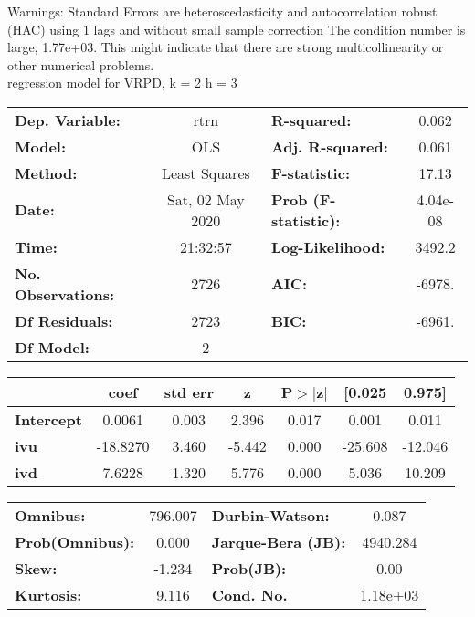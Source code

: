 Warnings: \newline
 [1] Standard Errors are heteroscedasticity and autocorrelation robust (HAC) using 1 lags and without small sample correction \newline
 [2] The condition number is large, 1.77e+03. This might indicate that there are \newline
 strong multicollinearity or other numerical problems.\\ 

regression model for VRPD, k = 2 h = 3\begin{center}
\begin{tabular}{lclc}
\toprule
\textbf{Dep. Variable:}    &       rtrn       & \textbf{  R-squared:         } &     0.062   \\
\textbf{Model:}            &       OLS        & \textbf{  Adj. R-squared:    } &     0.061   \\
\textbf{Method:}           &  Least Squares   & \textbf{  F-statistic:       } &     17.13   \\
\textbf{Date:}             & Sat, 02 May 2020 & \textbf{  Prob (F-statistic):} &  4.04e-08   \\
\textbf{Time:}             &     21:32:57     & \textbf{  Log-Likelihood:    } &    3492.2   \\
\textbf{No. Observations:} &        2726      & \textbf{  AIC:               } &    -6978.   \\
\textbf{Df Residuals:}     &        2723      & \textbf{  BIC:               } &    -6961.   \\
\textbf{Df Model:}         &           2      & \textbf{                     } &             \\
\bottomrule
\end{tabular}
\begin{tabular}{lcccccc}
                   & \textbf{coef} & \textbf{std err} & \textbf{z} & \textbf{P$> |$z$|$} & \textbf{[0.025} & \textbf{0.975]}  \\
\midrule
\textbf{Intercept} &       0.0061  &        0.003     &     2.396  &         0.017        &        0.001    &        0.011     \\
\textbf{ivu}       &     -18.8270  &        3.460     &    -5.442  &         0.000        &      -25.608    &      -12.046     \\
\textbf{ivd}       &       7.6228  &        1.320     &     5.776  &         0.000        &        5.036    &       10.209     \\
\bottomrule
\end{tabular}
\begin{tabular}{lclc}
\textbf{Omnibus:}       & 796.007 & \textbf{  Durbin-Watson:     } &    0.087  \\
\textbf{Prob(Omnibus):} &   0.000 & \textbf{  Jarque-Bera (JB):  } & 4940.284  \\
\textbf{Skew:}          &  -1.234 & \textbf{  Prob(JB):          } &     0.00  \\
\textbf{Kurtosis:}      &   9.116 & \textbf{  Cond. No.          } & 1.18e+03  \\
\bottomrule
\end{tabular}
\end{center}


